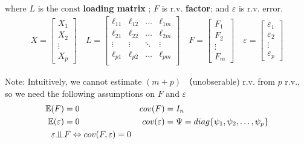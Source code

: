     where $ L $ is the $ \mathrm{const} $ \textbf{loading matrix} ; $ F $ is r.v. \textbf{factor}; and $ \varepsilon  $ is r.v. error.
    \begin{align}
        X=\begin{bmatrix}
            X_1\\X_2\\\vdots\\X_p
        \end{bmatrix}\quad
        L=\begin{bmatrix}
        \ell_{11}&\ell_{12}&\ldots&\ell_{1m}\\
        \ell_{21}&\ell_{22}&\ldots&\ell_{2m}\\
        \vdots&\vdots&\ddots&\vdots\\
        \ell_{p1}&\ell_{p2}&\ldots&\ell_{pm}\\
        \end{bmatrix}\quad
        F=\begin{bmatrix}
            F_1\\F_2\\\vdots\\F_m
        \end{bmatrix}
        \quad
        \varepsilon =\begin{bmatrix}
            \varepsilon _1\\\varepsilon _2\\\vdots\\\varepsilon _p
        \end{bmatrix}
    \end{align}

    Note: Intuitively, we cannot estimate $ (m+p) $ （unobserable) r.v. from $ p $ r.v., so we need the following assumptions on $ F $ and $ \varepsilon  $
    \begin{equation}
        \begin{aligned}
            \mathbb{E}(F)&=0&cov(F)&=I_n\\
            \mathbb{E}(\varepsilon )&=0&cov(\varepsilon )&=\Psi =diag\{\psi _1,\psi _2,\ldots ,\psi _p\}\\
            \varepsilon \bot\!\!\!\bot& F\Leftrightarrow cov(F,\varepsilon )=0&&
        \end{aligned}
    \end{equation}

